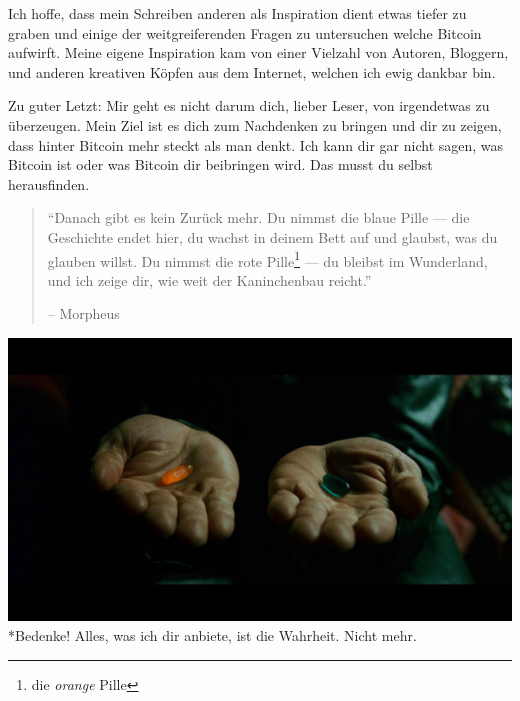 Ich hoffe, dass mein Schreiben anderen als Inspiration dient etwas tiefer
zu graben und einige der weitgreiferenden Fragen zu untersuchen welche Bitcoin
aufwirft. Meine eigene Inspiration kam von einer Vielzahl von Autoren, Bloggern,
und anderen kreativen Köpfen aus dem Internet, welchen ich ewig dankbar bin.

Zu guter Letzt: Mir geht es nicht darum dich, lieber Leser, von irgendetwas zu
überzeugen. Mein Ziel ist es dich zum Nachdenken zu bringen und dir zu zeigen,
dass hinter Bitcoin mehr steckt als man denkt. Ich kann dir gar nicht sagen,
was Bitcoin ist oder was Bitcoin dir beibringen wird. Das musst du selbst
herausfinden.

\begin{quotation}\begin{samepage}
\enquote{Danach gibt es kein Zurück mehr. Du nimmst die blaue Pille --- die
Geschichte endet hier, du wachst in deinem Bett auf und glaubst, was du glauben
willst. Du nimmst die rote Pille\footnote{die \textit{orange} Pille} --- du
bleibst im Wunderland, und ich zeige dir, wie weit der Kaninchenbau reicht.}
\begin{flushright} -- Morpheus
\end{flushright}\end{samepage}\end{quotation}

\begin{center}
  \includegraphics[width=\textwidth]{assets/images/bitcoin-orange-pill.jpg}
  *{Bedenke! Alles, was ich dir anbiete, ist die Wahrheit. Nicht mehr.}
  \label{fig:bitcoin-orange-pill}
\end{center}

%
%
%
